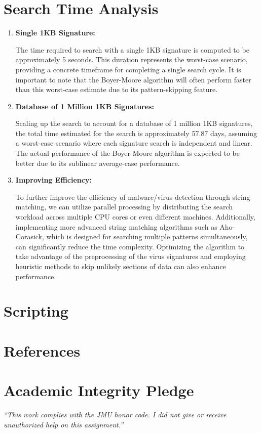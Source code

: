 \documentclass{article}
\begin{document}
\section*{Search Time Analysis}

\begin{enumerate}
    \item \textbf{Single 1KB Signature:}
    
    The time required to search with a single 1KB signature is computed to be approximately 5 seconds. This duration represents the worst-case scenario, providing a concrete timeframe for completing a single search cycle. It is important to note that the Boyer-Moore algorithm will often perform faster than this worst-case estimate due to its pattern-skipping feature.
    
    \item \textbf{Database of 1 Million 1KB Signatures:}
    
    Scaling up the search to account for a database of 1 million 1KB signatures, the total time estimated for the search is approximately 57.87 days, assuming a worst-case scenario where each signature search is independent and linear. The actual performance of the Boyer-Moore algorithm is expected to be better due to its sublinear average-case performance.
    
    \item \textbf{Improving Efficiency:}
    
    To further improve the efficiency of malware/virus detection through string matching, we can utilize parallel processing by distributing the search workload across multiple CPU cores or even different machines. Additionally, implementing more advanced string matching algorithms such as Aho-Corasick, which is designed for searching multiple patterns simultaneously, can significantly reduce the time complexity. Optimizing the algorithm to take advantage of the preprocessing of the virus signatures and employing heuristic methods to skip unlikely sections of data can also enhance performance.  
    
\end{enumerate}

\section*{Scripting}

%

%

\newpage
\section*{References}

\vfill 
  \section*{Academic Integrity Pledge}
   {\color{red}\textit{“This work complies with the JMU honor code. I did not give or receive unauthorized help on this assignment.”}}
\end{document}
